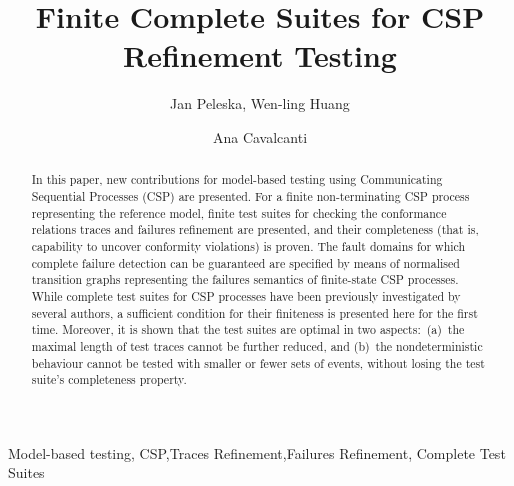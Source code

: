 \documentclass[3p,times]{elsarticle}
\begin{document}

\begin{frontmatter}

\title{Finite Complete Suites for CSP Refinement Testing}

\author{Jan Peleska, Wen-ling Huang }
\address{Bremen, Germany}

\author{Ana Cavalcanti }
\address{York, United Kingdom}

%
%


\begin{abstract}
In this paper, new contributions for model-based testing using Communicating
Sequential Processes (CSP) are presented. For a finite non-terminating CSP
process representing the reference model, finite test suites for checking the
conformance relations traces and failures refinement are presented, and their
completeness (that is, capability to uncover conformity violations) is
proven. The fault domains for which complete failure detection can be
guaranteed are specified by means of normalised transition graphs
representing the failures semantics of finite-state CSP processes. While
complete test suites for CSP processes have been previously investigated by
several authors, a sufficient condition for their finiteness is presented
here for the first time. Moreover, it is shown that the test suites are
optimal in two aspects:~(a)~the maximal length of test traces cannot be
further reduced, and (b)~the nondeterministic behaviour cannot be tested with
smaller or fewer sets of events, without losing the test suite's completeness
property.
\end{abstract}


\begin{keyword}
Model-based testing, CSP\sep Traces Refinement\sep Failures Refinement\sep
Complete Test Suites
\end{keyword}


\end{frontmatter}
\end{document}
